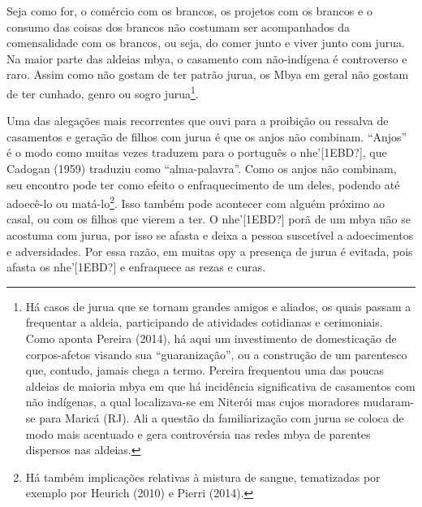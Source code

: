 \documentclass{article}
\begin{document}
Seja como for, o com\'ercio com os brancos, os projetos com os brancos e
o consumo das coisas dos brancos n\~ao costumam ser acompanhados da
comensalidade com os brancos, ou seja, do comer junto e viver junto com
jurua. Na maior parte das aldeias mbya, o casamento com
n\~ao-ind\'igena \'e controverso e raro. Assim como n\~ao gostam de ter
patr\~ao jurua, os Mbya em geral n\~ao gostam de ter cunhado, genro ou
sogro jurua\footnote{ H\'a casos de jurua que se tornam grandes amigos
e aliados, os quais passam a frequentar a aldeia, participando de
atividades cotidianas e cerimoniais. Como aponta Pereira (2014), h\'a
aqui um investimento de domestica\c{c}\~ao de corpos-afetos visando sua
{\textquotedblleft}guaraniza\c{c}\~ao{\textquotedblright}, ou a
constru\c{c}\~ao de um parentesco que, contudo, jamais chega a termo.
Pereira frequentou uma das poucas aldeias de maioria mbya em que h\'a
incid\^encia significativa de casamentos com n\~ao ind\'igenas, a qual
localizava-se em Niter\'oi mas cujos moradores mudaram-se para Maric\'a
(RJ). Ali a quest\~ao da familiariza\c{c}\~ao com jurua se coloca de
modo mais acentuado e gera controv\'ersia nas redes mbya de parentes
dispersos nas aldeias.}. 

Uma das alega\c{c}\~oes mais recorrentes que ouvi para a proibi\c{c}\~ao
ou ressalva de casamentos e gera\c{c}\~ao de filhos com jurua \'e que
os anjos n\~ao combinam. {\textquotedblleft}Anjos{\textquotedblright}
\'e o modo como muitas vezes traduzem para o portugu\^es o
nhe{\textquoteright}[1EBD?], que Cadogan (1959) traduziu como
{\textquotedblleft}alma-palavra{\textquotedblright}. Como os anjos
n\~ao combinam, seu encontro pode ter como efeito o enfraquecimento de
um deles, podendo at\'e adoec\^e-lo ou mat\'a-lo\footnote{ H\'a
tamb\'em implica\c{c}\~oes relativas \`a mistura de sangue, tematizadas
por exemplo por Heurich (2010) e Pierri (2014).}. Isso tamb\'em pode
acontecer com algu\'em pr\'oximo ao casal, ou com os filhos que vierem
a ter. O nhe{\textquoteright}[1EBD?] por\~a de um mbya n\~ao se
acostuma com jurua, por isso se afasta e deixa a pessoa suscet\'ivel a
adoecimentos e adversidades. Por essa raz\~ao, em muitas opy a
presen\c{c}a de jurua \'e evitada, pois afasta os
nhe{\textquoteright}[1EBD?] e enfraquece as rezas e curas.
\end{document}
